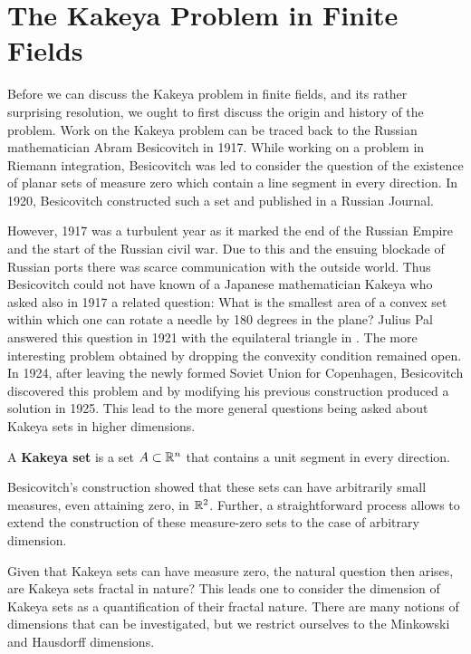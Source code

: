 \chapter{The Kakeya Problem in Finite Fields \label{chap:kakeya}}
Before we can discuss the Kakeya problem in finite fields, and its rather surprising resolution, we ought to first discuss the origin and history of the problem. 
Work on the Kakeya problem can be traced back to the Russian mathematician Abram Besicovitch in 1917. While working on a problem in Riemann integration, Besicovitch was led to consider the question of the existence of planar sets of measure zero which contain a line segment in every direction. In 1920, Besicovitch constructed such a set and published in a Russian Journal.

However, 1917 was a turbulent year as it marked the end of
the Russian Empire and the start of the Russian civil war. Due to this and the ensuing blockade of Russian ports there was scarce communication with the outside world.
Thus Besicovitch could not have known of a Japanese mathematician Kakeya who asked also in 1917 a related question: What is the smallest area of a convex set within which
one can rotate a needle by 180 degrees in the plane? Julius Pal answered this question in 1921 with the equilateral triangle in \cite{pal1920elementares}. The 
more interesting problem obtained by dropping the convexity condition remained open. In 1924, after leaving the newly formed Soviet Union for Copenhagen, Besicovitch discovered this
problem and by modifying his previous construction produced a solution in 1925. This lead to the more general questions being asked about Kakeya sets in higher dimensions.
\begin{definition}
    A \textbf{Kakeya set} is a set $A \subset \mathbb R^n$ that contains a unit segment in every direction.
\end{definition}
Besicovitch's construction showed that these sets can have arbitrarily small measures, even attaining zero, in $\mathbb R^2$. Further, a straightforward process allows to extend the construction of these measure-zero sets to the case of arbitrary dimension.

Given that Kakeya sets can have measure zero, the natural question then arises, are Kakeya sets fractal in nature? This leads one to consider the dimension of Kakeya sets as a quantification of their fractal nature. There are many notions of dimensions that can be investigated, but we restrict ourselves to the Minkowski and Hausdorff dimensions.

